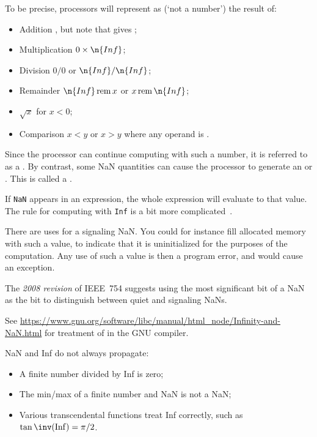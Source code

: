 To be precise,
processors will represent as  
(`not a number')
the result of:

\begin{itemize}
\item Addition , but note that  gives ;
\item Multiplication $0\times\n{Inf}$;
\item Division $0/0$ or $\n{Inf}/\n{Inf}$;
\item Remainder $\n{Inf}\mathop{\mathrm{rem}} x$ or
  $x\mathop{\mathrm{rem}} \n{Inf}$;
\item $\sqrt{x}$ for $x<0$;
\item Comparison $x<y$ or $x>y$ where any operand is .
\end{itemize}

Since the processor can continue computing with such a number, it is
referred to as a .
 By contrast, some NaN
quantities can cause the processor to generate an
 or . This is called a
. 

If \texttt{NaN} appears in an
expression, the whole expression will evaluate to that value. The rule
for computing with \texttt{Inf} is a bit more
complicated~\cite{goldberg:floatingpoint}.

There are uses for a signaling NaN. You could for instance fill
allocated memory with such a value, to indicate that it is
uninitialized for the purposes of the computation. Any use of such a
value is then a program error, and would cause an exception.

The \emph{2008 revision}%
 of IEEE~754 suggests using the most
significant bit of a NaN as the  bit to distinguish
between quiet and signaling NaNs.

See \url{https://www.gnu.org/software/libc/manual/html_node/Infinity-and-NaN.html}
for treatment of  in the GNU compiler.

\begin{remark}
  NaN and Inf do not always propagate:
  \begin{itemize}
  \item A finite number divided by Inf is zero;
  \item The min/max of a finite number and NaN is not a NaN;
  \item Various transcendental functions treat Inf correctly,
    such as $\tan\inv(\mathrm{Inf})=\pi/2$.
  \end{itemize}
\end{remark}

